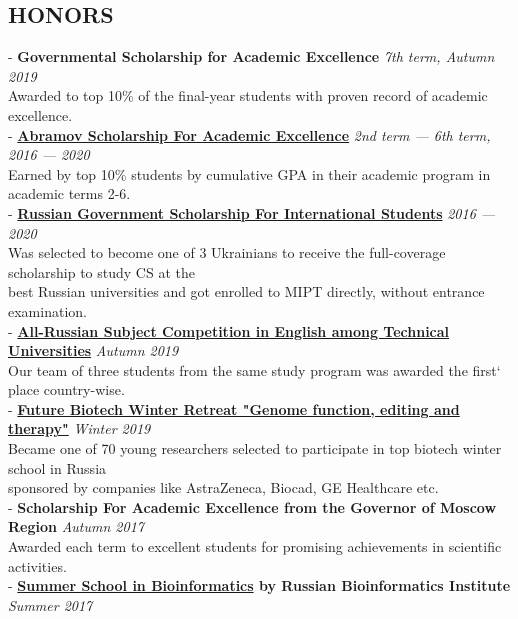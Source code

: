 \documentclass[11pt]{res}
\newcommand{\vmarginsmall}{\vspace{0.1cm}}
\begin{document}
\begin{resume}
\section{HONORS}
\vmarginsmall
- \textbf{Governmental Scholarship for Academic Excellence}\hfill{} \textit{7th term, Autumn 2019}\\
\hphantom{-} Awarded to top 10\% of the final-year students with proven record of academic excellence.\\
- \textbf{\href{http://phystech-foundation.org/en/foundation_}{Abramov Scholarship For Academic Excellence}} \hfill{} \textit{2nd term — 6th term, 2016 — 2020}\\
\hphantom{-} Earned by top 10\% students by cumulative GPA in their academic program in academic terms 2-6.\vspace{0.2em}\\
- \textbf{\href{https://studyinrussia.ru/en/study-in-russia/scholarships}{Russian Government Scholarship For International Students}} \hfill{} \textit{2016 — 2020}\\
\hphantom{-} Was selected to become one of 3 Ukrainians to receive the full-coverage scholarship to study CS at the \\\hphantom{-} best Russian universities and got enrolled to MIPT directly, without entrance examination.\vmarginsmall\\
- \textbf{\href{https://mon-vso.ru/events/248}{All-Russian Subject Competition in English among Technical Universities}} \hfill{} \textit{Autumn 2019}\\
\hphantom{-}  Our team of three students from the same study program was awarded the first` place country-wise.\\
- \textbf{\href{http://winter2019.futurebiotech.ru/}{Future Biotech Winter Retreat "Genome function, editing and therapy"}} \hfill{} \textit{Winter 2019}\\
\hphantom{-}  Became one of 70 young researchers selected to participate in top biotech winter school in Russia\\ 
\hphantom{-}  sponsored by companies like AstraZeneca, Biocad, GE Healthcare etc. \vmarginsmall\\
- \textbf{Scholarship For Academic Excellence from the Governor of Moscow Region} \hfill \textit{Autumn 2017}\\
\hphantom{-} Awarded each term to excellent students for promising achievements in scientific activities.\vmarginsmall\\
- \textbf{\href{https://bioinf.me/en/education}{Summer School in Bioinformatics} by Russian Bioinformatics Institute} \hfill{} \textit{Summer 2017}\\

\end{resume}
\end{document}
